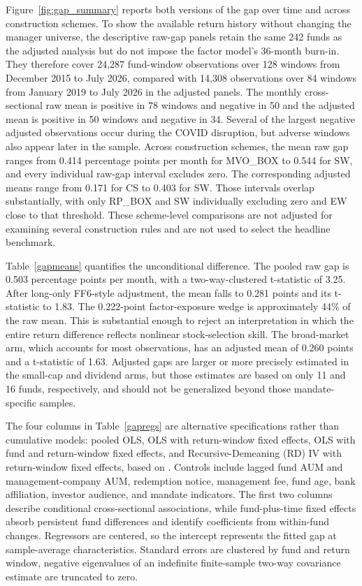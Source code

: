 \documentclass[preprint,12pt,authoryear]{elsarticle}
\begin{document}
Figure~\ref{fig:gap_summary} reports both versions of the gap over time and across construction schemes. To show the available return history without changing the manager universe, the descriptive raw-gap panels retain the same 242 funds as the adjusted analysis but do not impose the factor model's 36-month burn-in. They therefore cover 24,287 fund-window observations over 128 windows from December 2015 to July 2026, compared with 14,308 observations over 84 windows from January 2019 to July 2026 in the adjusted panels. The monthly cross-sectional raw mean is positive in 78 windows and negative in 50 and the adjusted mean is positive in 50 windows and negative in 34. Several of the largest negative adjusted observations occur during the COVID disruption, but adverse windows also appear later in the sample. Across construction schemes, the mean raw gap ranges from 0.414 percentage points per month for MVO\_BOX to 0.544 for SW, and every individual raw-gap interval excludes zero. The corresponding adjusted means range from 0.171 for CS to 0.403 for SW. Those intervals overlap substantially, with only RP\_BOX and SW individually excluding zero and EW close to that threshold. These scheme-level comparisons are not adjusted for examining several construction rules and are not used to select the headline benchmark.

Table~\ref{gapmeans} quantifies the unconditional difference. The pooled raw gap is 0.503 percentage points per month, with a two-way-clustered t-statistic of 3.25. After long-only FF6-style adjustment, the mean falls to 0.281 points and its t-statistic to 1.83. The 0.222-point factor-exposure wedge is approximately 44\% of the raw mean. This is substantial enough to reject an interpretation in which the entire return difference reflects nonlinear stock-selection skill. The broad-market arm, which accounts for most observations, has an adjusted mean of 0.260 points and a t-statistic of 1.63. Adjusted gaps are larger or more precisely estimated in the small-cap and dividend arms, but those estimates are based on only 11 and 16 funds, respectively, and should not be generalized beyond those mandate-specific samples.

The four columns in Table~\ref{gapregs} are alternative specifications rather than cumulative models: pooled OLS, OLS with return-window fixed effects, OLS with fund and return-window fixed effects, and Recursive-Demeaning (RD) IV with return-window fixed effects, based on \citet{pastorstambaughtaylor2015}. Controls include lagged fund AUM and management-company AUM, redemption notice, management fee, fund age, bank affiliation, investor audience, and mandate indicators. The first two columns describe conditional cross-sectional associations, while fund-plus-time fixed effects absorb persistent fund differences and identify coefficients from within-fund changes. Regressors are centered, so the intercept represents the fitted gap at sample-average characteristics. Standard errors are clustered by fund and return window, negative eigenvalues of an indefinite finite-sample two-way covariance estimate are truncated to zero.
\end{document}
